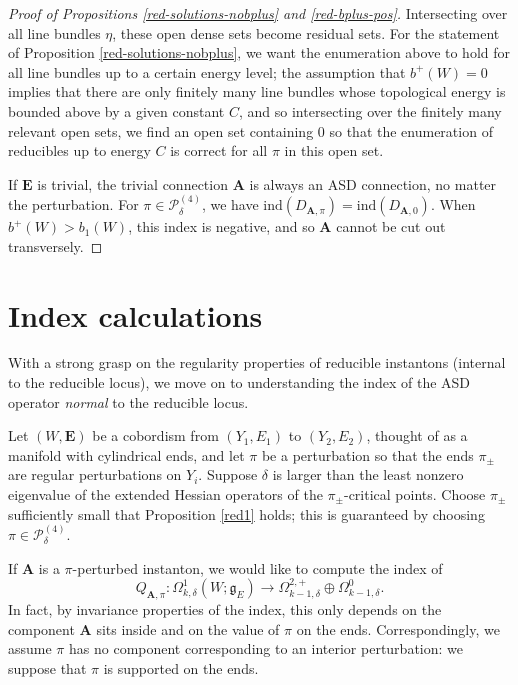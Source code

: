 \documentclass{memo-l}
\theoremstyle{definition}
\theoremstyle{remark}
\numberwithin{section}{chapter}
\numberwithin{equation}{chapter}
\begin{document}
\begin{proof}[Proof of Propositions \ref{red-solutions-nobplus} and \ref{red-bplus-pos}]
Intersecting over all line bundles $\eta$, these open dense sets become residual sets. For the statement of Proposition \ref{red-solutions-nobplus}, we want the enumeration above to hold for all line bundles up to a certain energy level; the assumption that $b^+(W) = 0$ implies that there are only finitely many line bundles whose topological energy is bounded above by a given constant $C$, and so intersecting over the finitely many relevant open sets, we find an open set containing $0$ so that the enumeration of reducibles up to energy $C$ is correct for all $\pi$ in this open set.

If $\mathbf{E}$ is trivial, the trivial connection $\mathbf{A}$ is always an ASD connection, no matter the perturbation. For $\pi \in \mathcal P^{(4)}_{\delta}$, we have $\text{ind}(D_{\mathbf{A},\pi}) = \text{ind}(D_{\mathbf{A},0})$. When $b^+(W) > b_1(W)$, this index is negative, and so $\mathbf{A}$ cannot be cut out transversely.
\end{proof}

\section{Index calculations}\label{sec:4d-index}
With a strong grasp on the regularity properties of reducible instantons (internal to the reducible locus), we move on to understanding the index of the ASD operator \emph{normal} to the reducible locus. 

Let $(W,\mathbf{E})$ be a cobordism from $(Y_1, E_1)$ to $(Y_2, E_2)$, thought of as a manifold with cylindrical ends, and let $\pi$ be a perturbation so that the ends $\pi_\pm$ are regular perturbations on $Y_i$. Suppose $\delta$ is larger than the least nonzero eigenvalue of the extended Hessian operators of the $\pi_\pm$-critical points. Choose $\pi_\pm$ sufficiently small that Proposition \ref{red1} holds; this is guaranteed by choosing $\pi \in \mathcal P^{(4)}_{\delta}$. 

If $\mathbf{A}$ is a $\pi$-perturbed instanton, we would like to compute the index of $$Q_{\mathbf{A},\pi}: \Omega^1_{k,\delta}(W;\mathfrak g_E) \to \Omega^{2,+}_{k-1,\delta} \oplus \Omega^0_{k-1,\delta}.$$ In fact, by invariance properties of the index, this only depends on the component $\mathbf{A}$ sits inside and on the value of $\pi$ on the ends. Correspondingly, we assume $\pi$ has no component corresponding to an interior perturbation: we suppose that $\pi$ is supported on the ends.
\end{document}
